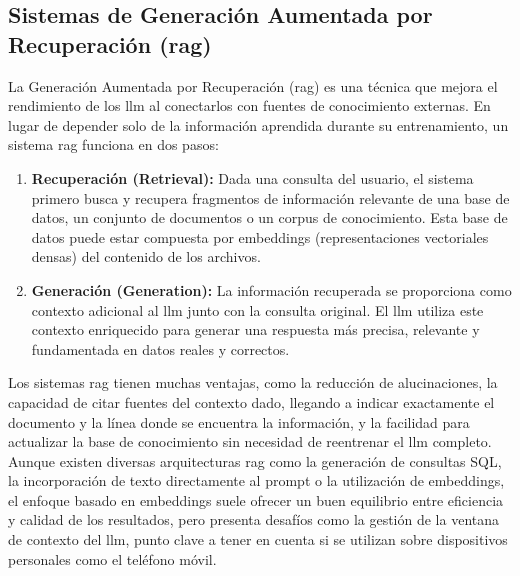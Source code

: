\subsection{Sistemas de Generación Aumentada por Recuperación (\gls{rag})}
La Generación Aumentada por Recuperación (\gls{rag}) es una técnica que mejora el rendimiento de los \gls{llm} al conectarlos con fuentes de conocimiento externas. En lugar de depender solo de la información aprendida durante su entrenamiento, un sistema \gls{rag} funciona en dos pasos:
\begin{enumerate}
    \item \textbf{Recuperación (Retrieval):} Dada una consulta del usuario, el sistema primero busca y recupera fragmentos de información relevante de una base de datos, un conjunto de documentos o un corpus de conocimiento. Esta base de datos puede estar compuesta por embeddings (representaciones vectoriales densas) del contenido de los archivos.
    \item \textbf{Generación (Generation):} La información recuperada se proporciona como contexto adicional al \gls{llm} junto con la consulta original. El \gls{llm} utiliza este contexto enriquecido para generar una respuesta más precisa, relevante y fundamentada en datos reales y correctos.
\end{enumerate}
Los sistemas \gls{rag} tienen muchas ventajas, como la reducción de alucinaciones, la capacidad de citar fuentes del contexto dado, llegando a indicar exactamente el documento y la línea donde se encuentra la información, y la facilidad para actualizar la base de conocimiento sin necesidad de reentrenar el \gls{llm} completo. Aunque existen diversas arquitecturas \gls{rag} como la generación de consultas SQL, la incorporación de texto directamente al prompt o la utilización de embeddings, el enfoque basado en embeddings suele ofrecer un buen equilibrio entre eficiencia y calidad de los resultados, pero presenta desafíos como la gestión de la ventana de contexto del \gls{llm}, punto clave a tener en cuenta si se utilizan sobre dispositivos personales como el teléfono móvil.

